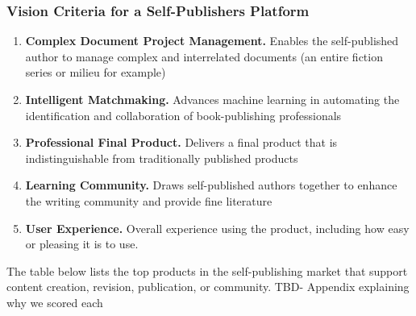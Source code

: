 \documentclass[11pt,openany]{book}
\providecommand{\tightlist}{%
  \setlength{\itemsep}{0pt}\setlength{\parskip}{0pt}}
\begin{document}
\hypertarget{vision-criteria-for-a-self-publishers-platform}{%
\subsubsection{Vision Criteria for a Self-Publishers
Platform}\label{vision-criteria-for-a-self-publishers-platform}}

\begin{enumerate}
\def\labelenumi{\arabic{enumi}.}
\tightlist
\item
  \textbf{Complex Document Project Management.} Enables the
  self-published author to manage complex and interrelated documents (an
  entire fiction series or milieu for example)
\item
  \textbf{Intelligent Matchmaking.} Advances machine learning in
  automating the identification and collaboration of book-publishing
  professionals
\item
  \textbf{Professional Final Product.} Delivers a final product that is
  indistinguishable from traditionally published products
\item
  \textbf{Learning Community.} Draws self-published authors together to
  enhance the writing community and provide fine literature
\item
  \textbf{User Experience.} Overall experience using the product,
  including how easy or pleasing it is to use.
\end{enumerate}

The table below lists the top products in the self-publishing market
that support content creation, revision, publication, or community. TBD-
Appendix explaining why we scored each

\newpage
\end{document}
